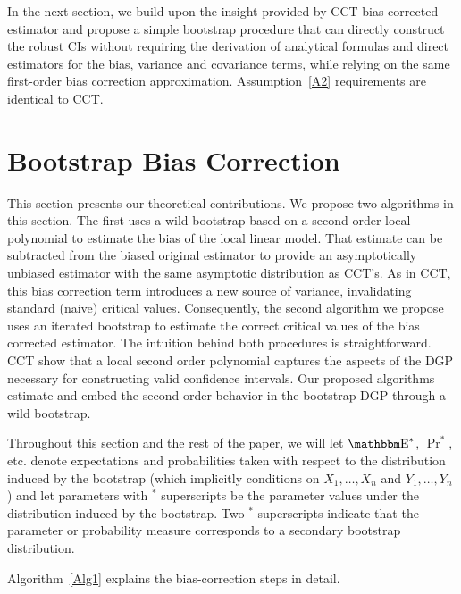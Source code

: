 \documentclass[12pt,fleqn]{article}
\begin{document}
In the next section, we build upon the insight provided by CCT bias-corrected
estimator and propose a simple bootstrap procedure that can directly construct
the robust CIs without requiring the derivation of analytical formulas and
direct estimators for the bias, variance and covariance terms, while relying on
the same first-order bias correction approximation. Assumption~\ref{A2} requirements are identical to CCT.

\section{Bootstrap Bias Correction}\label{boot}

This section presents our theoretical contributions. We propose two algorithms
in this section. The first uses a wild bootstrap based on a second
order local polynomial to estimate the bias of the local linear model. That
estimate can be subtracted from the biased original estimator to provide an
asymptotically unbiased estimator with the same asymptotic distribution as
CCT's. As in CCT, this bias correction term introduces a new source of variance,
invalidating standard (naive) critical values. Consequently, the second
algorithm we propose uses an iterated bootstrap to estimate the correct
critical values of the bias corrected estimator.
The intuition behind both procedures is straightforward. CCT show that a
local second order polynomial captures the aspects of the DGP
necessary for constructing valid confidence intervals. Our proposed algorithms
estimate and embed the second order behavior in the bootstrap DGP through a
wild bootstrap.

Throughout this section and the rest of the paper, we will
let $\E^{*}$, $\Pr^{*}$, etc. denote expectations and probabilities taken with
respect to the distribution induced by the bootstrap (which implicitly
conditions on $X_{1},\dots,X_{n}$ and $Y_{1},\dots,Y_{n}$) and let parameters with
$^{*}$ superscripts be the parameter values under the distribution induced by
the bootstrap. Two $^{*}$ superscripts indicate that the parameter or probability
measure corresponds to a secondary bootstrap distribution.

Algorithm~\ref{Alg1} explains the bias-correction steps in detail.
\end{document}
